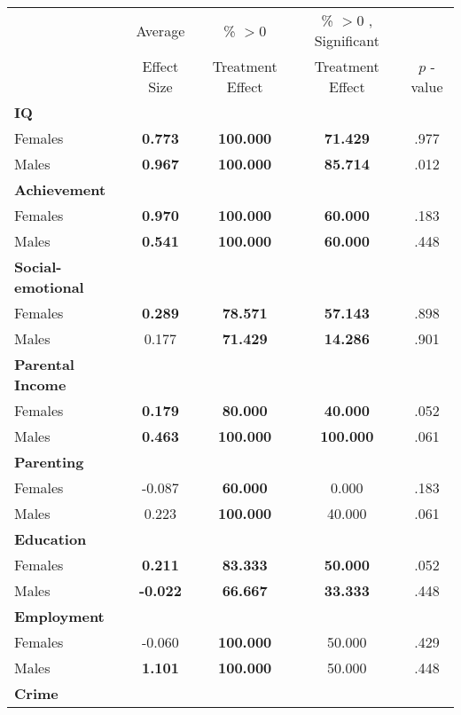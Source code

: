 \begin{tabular}{l c c c c}
\toprule
 & Average & \% $ >0 $ & \% $ >0 $ , Significant & \citet{Rosenbaum_2005_Distribution_JRSS} \\
 & Effect Size & Treatment Effect & Treatment Effect & $ p $ -value \\
\midrule
\textbf{IQ} & & & & \\
\quad Females &  \textbf{    0.773} & \textbf{  100.000} & \textbf{   71.429} & .977 \\
\quad Males &  \textbf{    0.967} & \textbf{  100.000} & \textbf{   85.714} & .012 \\
\midrule
\textbf{Achievement} & & & & \\
\quad Females &  \textbf{    0.970} & \textbf{  100.000} & \textbf{   60.000} & .183 \\
\quad Males &  \textbf{    0.541} & \textbf{  100.000} & \textbf{   60.000} & .448 \\
\midrule
\textbf{Social-emotional} & & & & \\
\quad Females &  \textbf{    0.289} & \textbf{   78.571} & \textbf{   57.143} & .898 \\
\quad Males &      0.177 & \textbf{   71.429} & \textbf{   14.286} & .901 \\
\midrule
\textbf{Parental Income} & & & & \\
\quad Females &  \textbf{    0.179} & \textbf{   80.000} & \textbf{   40.000} & .052 \\
\quad Males &  \textbf{    0.463} & \textbf{  100.000} & \textbf{  100.000} & .061 \\
\midrule
\textbf{Parenting} & & & & \\
\quad Females &     -0.087 & \textbf{   60.000} &     0.000 & .183 \\
\quad Males &      0.223 & \textbf{  100.000} &    40.000 & .061 \\
\midrule
\textbf{Education} & & & & \\
\quad Females &  \textbf{    0.211} & \textbf{   83.333} & \textbf{   50.000} & .052 \\
\quad Males &  \textbf{   -0.022} & \textbf{   66.667} & \textbf{   33.333} & .448 \\
\midrule
\textbf{Employment} & & & & \\
\quad Females &     -0.060 & \textbf{  100.000} &    50.000 & .429 \\
\quad Males &  \textbf{    1.101} & \textbf{  100.000} &    50.000 & .448 \\
\midrule
\textbf{Crime} & & & & \\

\end{tabular}
